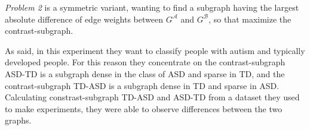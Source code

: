\textit{Problem 2} is a symmetric variant, wanting to find a subgraph having the largest absolute difference of edge weights between $G^{\mathcal{A}}$ and $G^{\mathcal{B}}$, so that maximize the contrast-subgraph. 
\vspace{0.5cm}

As said, in this experiment they want to classify people with autism and typically developed people. For this reason they concentrate on the contrast-subgraph ASD-TD is a subgraph dense in the class of ASD and sparse in TD, and the contrast-subgraph TD-ASD is a subgraph dense in TD and sparse in ASD. Calculating constrast-subgraph TD-ASD and ASD-TD from a dataset they used to make experiments, they were able to observe differences between the two graphs.
\vspace{0.5cm}

